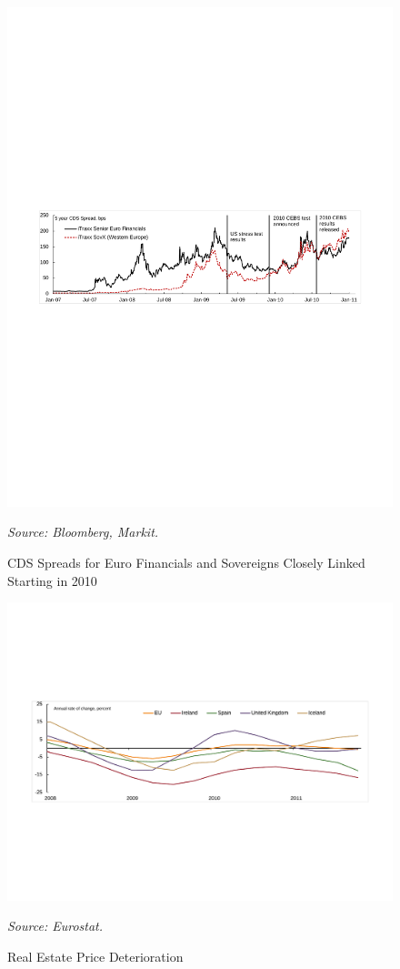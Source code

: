 \documentclass[12pt]{article}
\begin{document}
\begin{figure}[h]
\caption{CDS Spreads for Euro Financials and Sovereigns Closely Linked Starting in 2010}\label{figure1}
\centering
\includegraphics[width=\textwidth]{Chart.pdf}
\raggedright
\textit{\footnotesize Source: Bloomberg, Markit.}
\end{figure}

\begin{figure}[h]
\caption{Real Estate Price Deterioration}\label{figure2}
\centering
\includegraphics[width=\textwidth]{realestate.pdf}
\raggedright
\textit{\footnotesize Source: Eurostat.}
\end{figure}
\end{document}
